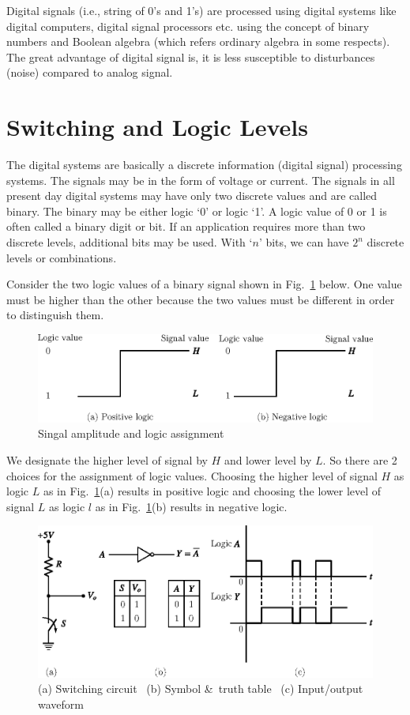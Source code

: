 Digital signals (i.e., string of 0's and 1's) are processed using digital systems like digital computers, digital signal processors etc. using the concept of binary numbers and Boolean algebra (which refers ordinary algebra in some respects). The great advantage of digital signal is, it is less susceptible to disturbances (noise) compared to analog signal.

\section{Switching and Logic Levels}\label{sec5.2}

The digital systems are basically a discrete information (digital signal) processing systems. The signals may be in the form of voltage or current. The signals in all present day digital systems may have only two discrete values and are called binary. The binary may be either logic `0' or logic `1'. A logic value of 0 or 1 is often called a binary digit or bit. If an application requires more than two discrete levels, additional bits may be used. With `$n$' bits, we can have $2^{n}$ discrete levels or combinations.

Consider the two logic values of a binary signal shown in Fig.~\ref{fig5.2} below. One value must be higher than the other because the two values must be different in order to distinguish them.
\begin{figure}[H]
\centering
\includegraphics{chap5/fig5.2.eps}
\caption{Singal amplitude and logic assignment}\label{fig5.2}
\end{figure}

We designate the higher level of signal by $H$ and lower level by $L$. So there are 2 choices for the assignment of logic values. Choosing the higher level of signal $H$ as logic $L$ as in Fig.~\ref{fig5.2}(a) results in positive logic and choosing the lower level of signal $L$ as logic $l$ as in Fig.~\ref{fig5.2}(b) results in negative logic.
\begin{figure}[H]
\centering
\includegraphics{chap5/fig5.3.eps}
\caption{(a) Switching circuit~ (b) Symbol \&\ truth table~ (c) Input/output waveform}\label{fig5.3}
\end{figure}

